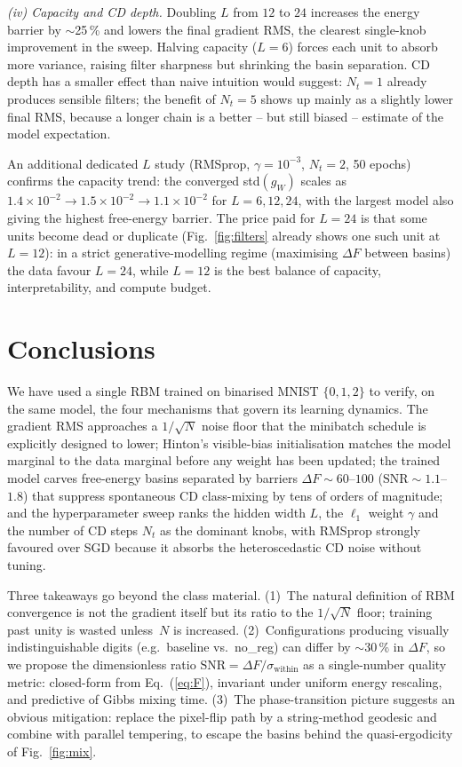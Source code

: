 \documentclass[10pt,twocolumn,a4paper]{article}
\begin{document}
\emph{(iv) Capacity and CD depth.} Doubling $L$ from $12$ to $24$
increases the energy barrier by $\sim$25\,\% and lowers the final
gradient RMS, the clearest single-knob improvement in the sweep.
Halving capacity ($L\!=\!6$) forces each unit to absorb more
variance, raising filter sharpness but shrinking the basin
separation. CD depth has a smaller effect than naive intuition would
suggest: $N_t\!=\!1$ already produces sensible filters; the benefit
of $N_t\!=\!5$ shows up mainly as a slightly lower final RMS, because
a longer chain is a better -- but still biased -- estimate of the
model expectation.

An additional dedicated $L$ study (RMSprop, $\gamma\!=\!10^{-3}$,
$N_t\!=\!2$, 50 epochs) confirms the capacity trend: the converged
std$(g_W)$ scales as
$1.4\!\times\!10^{-2}\!\to\!1.5\!\times\!10^{-2}\!\to\!1.1\!\times\!10^{-2}$
for $L\!=\!6,12,24$, with the largest model also giving the highest
free-energy barrier. The price paid for $L\!=\!24$ is that some units
become dead or duplicate (Fig.~\ref{fig:filters} already shows one
such unit at $L\!=\!12$): in a strict generative-modelling regime
(maximising $\Delta F$ between basins) the data favour $L\!=\!24$,
while $L\!=\!12$ is the best balance of capacity, interpretability,
and compute budget.

\section{Conclusions}

We have used a single RBM trained on binarised MNIST $\{0,1,2\}$ to
verify, on the same model, the four mechanisms that govern its
learning dynamics. The gradient RMS approaches a $1/\sqrt{N}$ noise
floor that the minibatch schedule is explicitly designed to lower;
Hinton's visible-bias initialisation matches the model marginal to
the data marginal before any weight has been updated; the trained
model carves free-energy basins separated by barriers
$\Delta F\!\sim\!60$--$100$ ($\mathrm{SNR}\!\sim\!1.1$--$1.8$) that
suppress spontaneous CD class-mixing by tens of orders of magnitude;
and the hyperparameter sweep ranks the hidden width $L$, the
$\ell_1$ weight $\gamma$ and the number of CD steps $N_t$ as the
dominant knobs, with RMSprop strongly favoured over SGD because it
absorbs the heteroscedastic CD noise without tuning.

Three takeaways go beyond the class material. (1)~The natural
definition of RBM convergence is not the gradient itself but its
ratio to the $1/\sqrt{N}$ floor; training past unity is wasted
unless~$N$ is increased. (2)~Configurations producing visually
indistinguishable digits (e.g.~baseline vs.~no\_reg) can differ by
$\sim$30\,\% in $\Delta F$, so we propose the dimensionless ratio
$\mathrm{SNR}=\Delta F/\sigma_{\mathrm{within}}$ as a single-number
quality metric: closed-form from Eq.~(\ref{eq:F}), invariant under
uniform energy rescaling, and predictive of Gibbs mixing time.
(3)~The phase-transition picture suggests an obvious mitigation:
replace the pixel-flip path by a string-method geodesic and combine
with parallel tempering, to escape the basins behind the
quasi-ergodicity of Fig.~\ref{fig:mix}.
\end{document}

